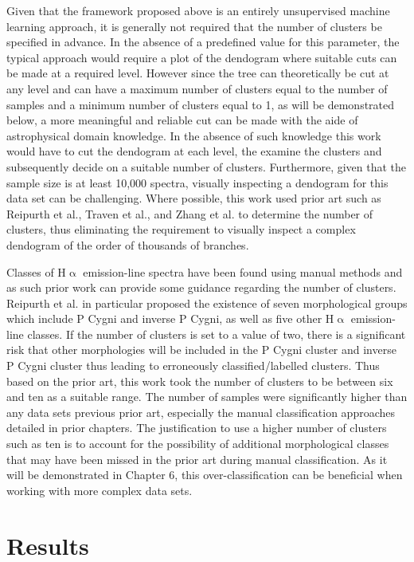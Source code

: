 Given that the framework proposed above is an entirely unsupervised machine learning approach, it is generally not required that the number of clusters be specified in advance. In the absence of a predefined value for this parameter, the typical approach would require a plot of the dendogram where suitable cuts can be made at a required level. However since the tree can theoretically be cut at any level and can have a maximum number of clusters equal to the number of samples and a minimum number of clusters equal to 1, as will be demonstrated below, a more meaningful and reliable cut can be made with the aide of astrophysical domain knowledge. In the absence of such knowledge this work would have to cut the dendogram at each level, the examine the clusters and subsequently decide on a suitable number of clusters. Furthermore, given that the sample size is at least 10,000 spectra, visually inspecting a dendogram for this data set can be challenging. Where possible, this work used prior art such as Reipurth et al.\cite{reipurth1996halpha}, Traven et al.\cite{traven2017galah}, and Zhang et al.\cite{zhang2021catalog} to determine the number of clusters, thus eliminating the requirement to visually inspect a complex dendogram of the order of thousands of branches. 

Classes of H$\upalpha$ emission-line spectra have been found using manual methods and as such prior work can provide some guidance regarding the number of clusters. Reipurth et al. in particular proposed the existence of seven morphological groups which include P Cygni and inverse P Cygni, as well as five other H$\upalpha$ emission-line classes\cite{reipurth1996halpha}. If the number of clusters is set to a value of two, there is a significant risk that other morphologies will be included in the P Cygni cluster and inverse P Cygni cluster thus leading to erroneously classified/labelled clusters. Thus based on the prior art, this work took the number of clusters to be between six and ten as a suitable range. The number of samples were significantly higher than any data sets previous prior art, especially the manual classification approaches detailed in prior chapters. The justification to use a higher number of clusters such as ten is to account for the possibility of additional morphological classes that may have been missed in the prior art during manual classification. As it will be demonstrated in Chapter 6, this over-classification can be beneficial when working with more complex data sets.

\section{Results}

